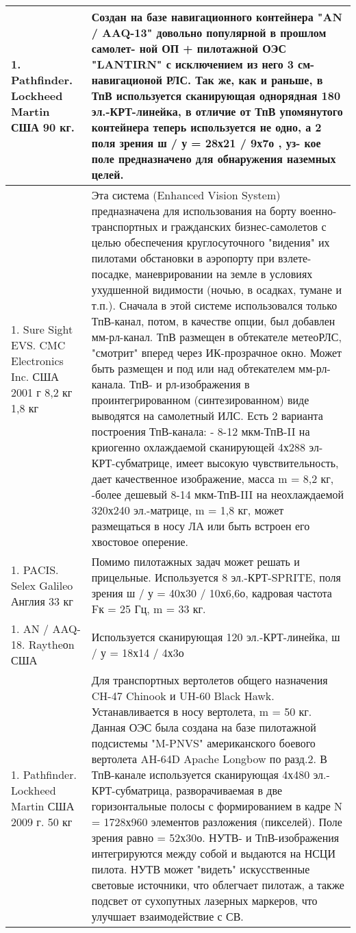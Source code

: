 \begin{landscape}
\begin{longtable}{| p{6cm} | p{18cm} |}
\\ \hline
		1.	Pathfinder. Lockheed Martin	США		90 кг.       
& 
Создан на базе навигационного контейнера "AN / AAQ-13" довольно популярной в прошлом самолет-
ной ОП + пилотажной ОЭС "LANTIRN" с исключением из него 3 см-навигационой РЛС. 
Так же, как и раньше, в ТпВ используется сканирующая однорядная 180 эл.-КРТ-линейка, в отличие 
от ТпВ упомянутого контейнера теперь используется не одно, а 2 поля зрения ш / у = 28х21 / 9х7о
, уз-
кое поле предназначено для обнаружения наземных целей.     
\\ \hline
		1.	Sure Sight EVS. CMC Electronics Inc.	США	2001 г	8,2 кг
		1,8 кг
		        
& 
Эта система (Enhanced Vision System) предназначена для использования на борту военно-транспортных и гражданских бизнес-самолетов с целью обеспечения круглосуточного "видения" их пилотами обстановки в аэропорту при взлете-посадке, маневрировании на земле в условиях ухудшенной видимости (ночью, в осадках, тумане и т.п.). 
Сначала в этой системе использовался только ТпВ-канал, потом, в качестве опции, был добавлен мм-рл-канал. ТпВ размещен в обтекателе метеоРЛС, "смотрит" вперед через ИК-прозрачное окно. Может быть размещен и под или над обтекателем мм-рл-канала. ТпВ- и рл-изображения в проинтегрированном (синтезированном) виде выводятся на самолетный ИЛС. Есть 2 варианта построения ТпВ-канала: - 8-12 мкм-ТпВ-II на криогенно охлаждаемой сканирующей 4х288 эл-КРТ-субматрице, имеет высокую чувствительность, дает качественное изображение, масса m = 8,2 кг, 
-более дешевый 8-14 мкм-ТпВ-III на неохлаждаемой 320х240 эл.-матрице, m = 1,8 кг, может размещаться в носу ЛА или быть встроен его хвостовое оперение.
    
\\ \hline
		1.	PACIS. Selex Galileo	Англия		33 кг        
& 
Помимо пилотажных задач может решать и прицельные. Используется 8 эл.-КРТ-SPRITE, поля зрения ш / у = 40х30 / 10х6,6о, кадровая частота Fк = 25 Гц, m = 33 кг.    
\\ \hline
	1.	AN / AAQ-18. Raytheоn	США		       
& 
Используется сканирующая 120 эл.-КРТ-линейка, ш / у = 18х14 / 4х3о   
\\ \hline
	1.	Pathfinder. Lockheed Martin	США	2009 г.	50 кг        
& 
Для транспортных вертолетов общего назначения CH-47 Chinook и UH-60 Black Hawk. Устанавливается в носу вертолета, m = 50 кг. 
Данная ОЭС была создана на базе пилотажной подсистемы "M-PNVS" американского боевого вертолета AH-64D Apache Longbow по разд.2. В ТпВ-канале используется сканирующая 4х480 эл.-КРТ-субматрица, разворачиваемая в две горизонтальные полосы с формированием в кадре N = 1728х960 элементов разложения (пикселей). Поле зрения равно = 52х30о. НУТВ- и ТпВ-изображения интегрируются между собой и выдаются на НСЦИ пилота. НУТВ может "видеть" искусственные световые источники, что облегчает пилотаж, а также подсвет от сухопутных лазерных маркеров, что улучшает взаимодействие с СВ. 
    

\end{longtable}
\end{landscape}
